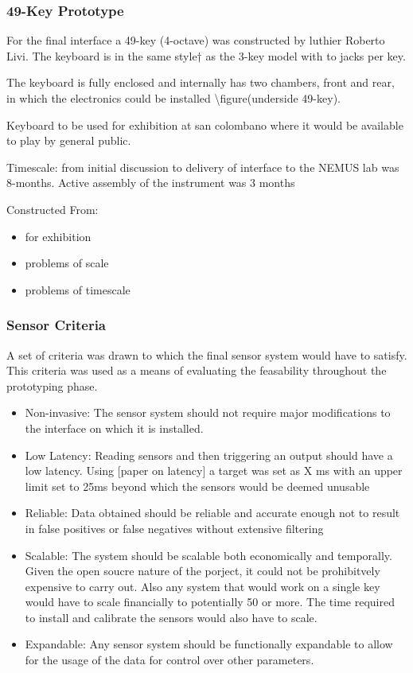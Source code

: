 \subsubsection{49-Key Prototype}\label{key-prototype-1}

For the final interface a 49-key (4-octave) was constructed by luthier
Roberto Livi. The keyboard is in the same style† as the 3-key model with
to jacks per key.

The keyboard is fully enclosed and internally has two chambers, front
and rear, in which the electronics could be installed
\textbackslash figure(underside 49-key).

Keyboard to be used for exhibition at san colombano where it would be
available to play by general public.

Timescale: from initial discussion to delivery of interface to the NEMUS
lab was 8-months. Active assembly of the instrument was 3 months

Constructed From:

\begin{itemize}
\item
  for exhibition
\item
  problems of scale
\item
  problems of timescale
\end{itemize}

\subsubsection{Sensor Criteria}\label{sensor-criteria}

A set of criteria was drawn to which the final sensor system would have
to satisfy. This criteria was used as a means of evaluating the
feasability throughout the prototyping phase.

\begin{itemize}
\item
  Non-invasive: The sensor system should not require major modifications
  to the interface on which it is installed.
\item
  Low Latency: Reading sensors and then triggering an output should have
  a low latency. Using {[}paper on latency{]} a target was set as X ms
  with an upper limit set to 25ms beyond which the sensors would be
  deemed unusable
\item
  Reliable: Data obtained should be reliable and accurate enough not to
  result in false positives or false negatives without extensive
  filtering
\item
  Scalable: The system should be scalable both economically and
  temporally. Given the open soucre nature of the porject, it could not
  be prohibitvely expensive to carry out. Also any system that would
  work on a single key would have to scale financially to potentially 50
  or more. The time required to install and calibrate the sensors would
  also have to scale.
\item
  Expandable: Any sensor system should be functionally expandable to
  allow for the usage of the data for control over other parameters.
\end{itemize}

